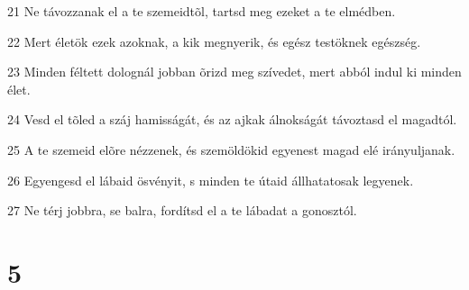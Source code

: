 \par 21 Ne távozzanak el a te szemeidtõl, tartsd meg ezeket a te elmédben.
\par 22 Mert életök ezek azoknak, a kik megnyerik, és egész testöknek egészség.
\par 23 Minden féltett dolognál jobban õrizd meg szívedet, mert abból indul ki minden élet.
\par 24 Vesd el tõled a száj hamisságát, és az ajkak álnokságát távoztasd el magadtól.
\par 25 A te szemeid elõre nézzenek, és szemöldökid egyenest magad elé irányuljanak.
\par 26 Egyengesd el lábaid ösvényit, s minden te útaid állhatatosak legyenek.
\par 27 Ne térj jobbra, se balra, fordítsd el a te lábadat a gonosztól.

\chapter{5}


